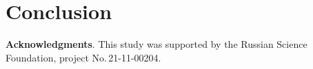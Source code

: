 \documentclass{svproc}
\begin{document}



\section{Conclusion}



\medskip

\textbf{Acknowledgments}. This study was supported by the Russian Science Foundation, project No.\,21-11-00204.

%
%

{}
\end{document}
